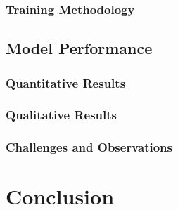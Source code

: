 \documentclass{article} %
\begin{document}
\subsubsection{Training Methodology}



\subsection{Model Performance}


\subsubsection{Quantitative Results}
\subsubsection{Qualitative Results}
\subsubsection{Challenges and Observations}

\section{Conclusion}
\label{last_page}
\end{document}
